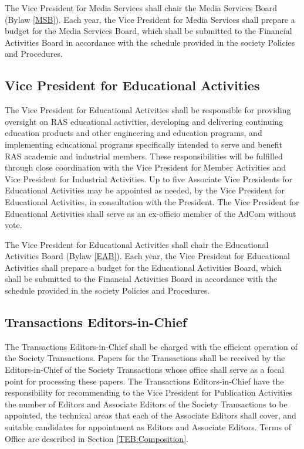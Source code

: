 \documentclass[10pt]{article}
\newcommand{\blref}[1]{Bylaw \ref{#1}}
\newcommand{\secref}[1]{Section \ref{#1}}
\begin{document}
The Vice President for Media Services shall chair the Media Services Board (\blref{MSB}). Each year, the Vice President for Media Services shall prepare a budget for the Media Services Board, which shall be submitted to the Financial Activities Board in accordance with the schedule provided in the society Policies and Procedures.

\subsection{Vice President for Educational Activities}

The Vice President for Educational Activities shall be responsible for providing oversight on RAS educational activities, developing and delivering continuing education products and other engineering and education programs, and implementing educational programs specifically intended to serve and benefit RAS academic and industrial members. These responsibilities will be fulfilled through close coordination with the Vice President for Member Activities and Vice President for Industrial Activities. 
Up to five Associate Vice Presidents for Educational Activities may be appointed as needed, by the Vice President for Educational Activities, in consultation with the President. The Vice President for Educational Activities shall serve as an ex-officio member of the AdCom without vote.

The Vice President for Educational Activities shall chair the Educational Activities Board (\blref{EAB}). Each year, the Vice President for Educational Activities shall prepare a budget for the Educational Activities Board, which shall be submitted to the Financial Activities Board in accordance with the schedule provided in the society Policies and Procedures.


\subsection{Transactions Editors-in-Chief}

The Transactions Editors-in-Chief shall be charged with the efficient operation of the Society Transactions.  Papers for the Transactions shall be received by the Editors-in-Chief of the Society Transactions whose office shall serve as a focal point for processing these papers. The Transactions Editors-in-Chief have the responsibility for recommending to the Vice President for Publication Activities the number of Editors and Associate Editors of the Society Transactions to be appointed, the technical areas that each of the Associate Editors shall cover, and suitable candidates for appointment as Editors and Associate Editors. Terms of Office are described in \secref{TEB:Composition}.
\end{document}
